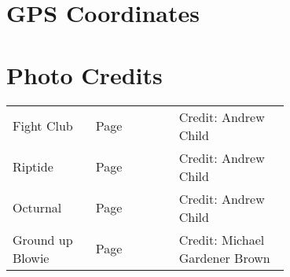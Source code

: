 \begin{multicols*}{2}
\section{GPS Coordinates}
\section{Photo Credits}
\begin{supertabular}{p{0.3\linewidth}lp{0.4\linewidth}}
Fight Club&Page \pageref{pt:Fight Club}&Credit: Andrew Child\\
Riptide&Page \pageref{pt:Riptide}&Credit: Andrew Child\\
Octurnal&Page \pageref{pt:Octurnal}&Credit: Andrew Child\\
Ground up Blowie&Page \pageref{pt:Ground up Blowie}&Credit: Michael Gardener Brown\\
\end{supertabular}

\end{multicols*}
\clearpage